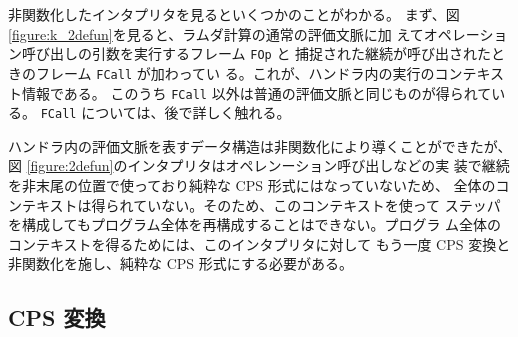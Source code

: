 非関数化したインタプリタを見るといくつかのことがわかる。
まず、図 \ref{figure:k_2defun}を見ると、ラムダ計算の通常の評価文脈に加
えてオペレーション呼び出しの引数を実行するフレーム \texttt{FOp} と
捕捉された継続が呼び出されたときのフレーム \texttt{FCall} が加わってい
る。これが、ハンドラ内の実行のコンテキスト情報である。
このうち \texttt{FCall} 以外は普通の評価文脈と同じものが得られている。
\texttt{FCall} については、後で詳しく触れる。

ハンドラ内の評価文脈を表すデータ構造は非関数化により導くことができたが、
図 \ref{figure:2defun}のインタプリタはオペレンーション呼び出しなどの実
装で継続を非末尾の位置で使っており純粋な CPS 形式にはなっていないため、
全体のコンテキストは得られていない。そのため、このコンテキストを使って
ステッパを構成してもプログラム全体を再構成することはできない。プログラ
ム全体のコンテキストを得るためには、このインタプリタに対して
もう一度 CPS 変換と非関数化を施し、純粋な CPS 形式にする必要がある。




\subsection{CPS 変換}
\label{subsection:3cps}

